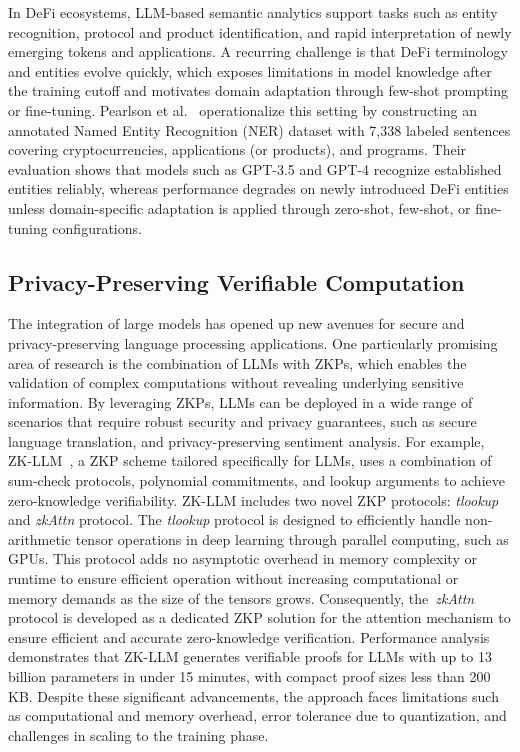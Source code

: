 \documentclass[5p,twocolumn]{elsarticle}
\begin{document}
In DeFi ecosystems, LLM-based semantic analytics support tasks such as entity recognition, protocol and product identification, and rapid interpretation of newly emerging tokens and applications. A recurring challenge is that DeFi terminology and entities evolve quickly, which exposes limitations in model knowledge after the training cutoff and motivates domain adaptation through few-shot prompting or fine-tuning. Pearlson et al.~\cite{pearlson2024evaluating} operationalize this setting by constructing an annotated Named Entity Recognition (NER) dataset with 7,338 labeled sentences covering cryptocurrencies, applications (or products), and programs. Their evaluation shows that models such as GPT-3.5 and GPT-4 recognize established entities reliably, whereas performance degrades on newly introduced DeFi entities unless domain-specific adaptation is applied through zero-shot, few-shot, or fine-tuning configurations.

\subsection{Privacy-Preserving Verifiable Computation}
The integration of large models has opened up new avenues for secure and privacy-preserving language processing applications. One particularly promising area of research is the combination of LLMs with ZKPs, which enables the validation of complex computations without revealing underlying sensitive information. By leveraging ZKPs, LLMs can be deployed in a wide range of scenarios that require robust security and privacy guarantees, such as secure language translation, and privacy-preserving sentiment analysis. For example, ZK-LLM~\cite{sun2024zkllm}, a ZKP scheme tailored specifically for LLMs, uses a combination of sum-check protocols, polynomial commitments, and lookup arguments to achieve zero-knowledge verifiability. ZK-LLM includes two novel ZKP protocols: \emph{tlookup} and \emph{zkAttn} protocol. The \emph{tlookup} protocol is designed to efficiently handle non-arithmetic tensor operations in deep learning through parallel computing, such as GPUs. This protocol adds no asymptotic overhead in memory complexity or runtime to ensure efficient operation without increasing computational or memory demands as the size of the tensors grows. Consequently, the~\emph{zkAttn} protocol is developed as a dedicated ZKP solution for the attention mechanism to ensure efficient and accurate zero-knowledge verification. Performance analysis demonstrates that ZK-LLM generates verifiable proofs for LLMs with up to 13 billion parameters in under 15 minutes, with compact proof sizes less than 200 KB. Despite these significant advancements, the approach faces limitations such as computational and memory overhead, error tolerance due to quantization, and challenges in scaling to the training phase.
\end{document}
